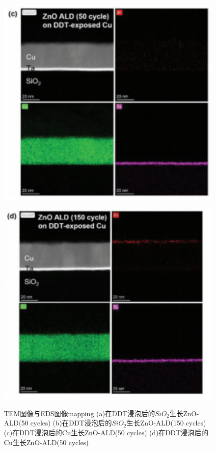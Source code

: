 \documentclass[UTF8,a4paper,12pt]{ctexart}%
\begin{document}
\begin{figure}[htb]
\begin{minipage}[t]{0.45\textwidth}
	\label{Fig:16}
	\end{minipage}
	\begin{minipage}[t]{0.45\textwidth}
	\centering
	\includegraphics[width=1\textwidth]{17.jpg}
	\label{Fig:17}
	\end{minipage}
	\begin{minipage}[t]{0.45\textwidth}
	\centering
	\includegraphics[width=1\textwidth]{18.jpg}
	\label{Fig:18}
	\end{minipage}
	\caption{TEM图像与EDS图像mapping (a)在DDT浸泡后的$SiO_2$生长ZnO-ALD(50 cycles) 
	(b)在DDT浸泡后的$SiO_2$生长ZnO-ALD(150 cycles) (c)在DDT浸泡后的Cu生长ZnO-ALD(50 cycles)
	 (d)在DDT浸泡后的Cu生长ZnO-ALD(50 cycles)}
\end{figure}
\end{document}
